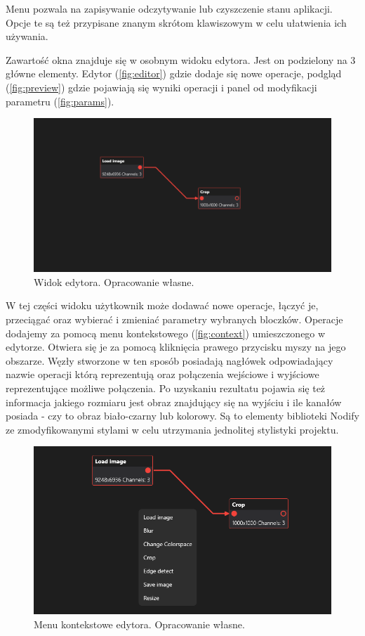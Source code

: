Menu pozwala na zapisywanie odczytywanie lub czyszczenie stanu aplikacji. 
Opcje te są też przypisane znanym skrótom klawiszowym w celu ułatwienia ich używania.

Zawartość okna znajduje się w osobnym widoku edytora. Jest on podzielony na 3 główne elementy. Edytor (\autoref{fig:editor}) gdzie dodaje się nowe operacje, podgląd (\autoref{fig:preview}) gdzie pojawiają się wyniki operacji i panel od modyfikacji parametru (\autoref{fig:params}).

\begin{figure}[H]
    \centering
    \includegraphics[width=1\linewidth]{images/Picture15.png}
    \caption{Widok edytora. Opracowanie własne.}
    \label{fig:editor}
\end{figure}

W tej części widoku użytkownik może dodawać nowe operacje, łączyć je, przeciągać oraz wybierać i zmieniać parametry wybranych bloczków. 
Operacje dodajemy za pomocą menu kontekstowego (\autoref{fig:context}) umieszczonego w edytorze. 
Otwiera się je za pomocą kliknięcia prawego przycisku myszy na jego obszarze.
Węzły stworzone w ten sposób posiadają nagłówek odpowiadający nazwie operacji którą reprezentują oraz połączenia wejściowe i wyjściowe reprezentujące możliwe połączenia.
Po uzyskaniu rezultatu pojawia się też informacja jakiego rozmiaru jest obraz znajdujący się na wyjściu i ile kanałów posiada - czy to obraz biało-czarny lub kolorowy.
Są to elementy biblioteki Nodify \cite{nodify} ze zmodyfikowanymi stylami w celu utrzymania jednolitej stylistyki projektu.

\begin{figure}[H]
    \centering
    \includegraphics[width=0.6\linewidth]{images/Picture18.png}
    \caption{Menu kontekstowe edytora. Opracowanie własne.}
    \label{fig:context}
\end{figure}


